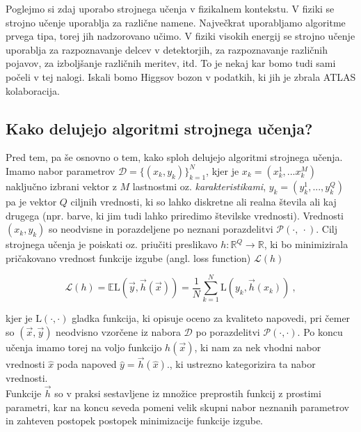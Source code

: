 \documentclass[a4paper]{article}
\begin{document}
Poglejmo si zdaj uporabo strojnega učenja v fizikalnem kontekstu. V fiziki se strojno učenje uporablja za različne
namene. Največkrat uporabljamo algoritme prvega tipa, torej jih nadzorovano učimo. V fiziki visokih energij se strojno
učenje uporablja za razpoznavanje delcev v detektorjih, za razpoznavanje različnih pojavov, za izboljšanje različnih 
meritev, itd. To je nekaj kar bomo tudi sami počeli v tej nalogi. Iskali bomo Higgsov bozon v podatkih, ki jih je
zbrala ATLAS kolaboracija. \\

\subsection{Kako delujejo algoritmi strojnega učenja?}
Pred tem, pa še osnovno o tem, kako sploh delujejo algoritmi strojnega učenja. Imamo nabor parametrov $\mathcal{D} = 
\{(x_k, y_k)\}_{k=1}^N$, kjer je $x_k = (x_k^1,...x_k^M)$ naključno izbrani vektor z $M$ lastnostmi oz. 
\textit{karakteristikami}, $y_k = (y_k^1,...,y_k^Q)$  pa je vektor $Q$ ciljnih vrednosti, ki so lahko diskretne ali
realna števila ali kaj drugega (npr. barve, ki jim tudi lahko priredimo številske vrednosti). Vrednosti $(x_k, y_k)$
so neodvisne in porazdeljene po neznani porazdelitvi $\mathcal{P}(\cdot,\>\cdot)$. Cilj strojnega učenja je poiskati
oz. priučiti preslikavo $h: \mathbb{R}^Q \rightarrow \mathbb{R}$, ki bo minimizirala pričakovano vrednost funkcije 
izgube (angl. loss function) $\mathcal{L}(h)$

\begin{equation}
    \mathcal{L}(h) = \mathbb{E}\mathrm{L}(\vec{y}, \vec{h}(\vec{x})) = \frac{1}{N} \sum_{k=1}^N{\mathrm{L}(y_k, \vec{h}(x_k))}\>,
\end{equation}

kjer je $\mathrm{L}(\cdot,\cdot)$ gladka funkcija, ki opisuje oceno za kvaliteto napovedi, pri čemer so $(\vec{x}, \vec{y})$
neodvisno vzorčene iz nabora $\mathcal{D}$ po porazdelitvi $\mathcal{P}(\cdot,\cdot)$. Po koncu učenja imamo torej na voljo 
funkcijo $h(\vec{x})$, ki nam za nek vhodni nabor vrednosti $\hat{x}$ poda napoved $\hat{y} = \vec{h}(\hat{x})$., ki ustrezno
kategorizira ta nabor vrednosti.\\

Funkcije $\vec{h}$ so v praksi sestavljene iz množice preprostih funkcij z prostimi parametri, kar na koncu seveda pomeni 
velik skupni nabor neznanih parametrov in zahteven postopek postopek minimizacije funkcije izgube.
\end{document}
